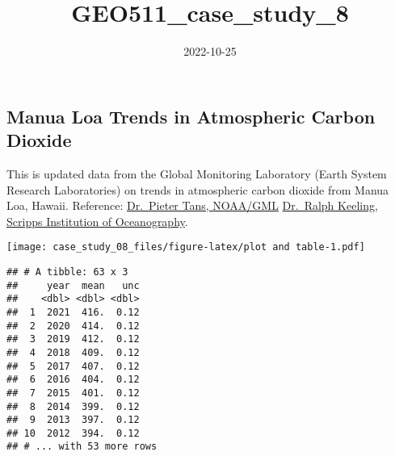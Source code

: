 \documentclass[
]{article}
\title{GEO511\_case\_study\_8}
\author{}
\date{\vspace{-2.5em}2022-10-25}
\begin{document}
\maketitle

\hypertarget{manua-loa-trends-in-atmospheric-carbon-dioxide}{%
\subsection{Manua Loa Trends in Atmospheric Carbon
Dioxide}\label{manua-loa-trends-in-atmospheric-carbon-dioxide}}

This is updated data from the Global Monitoring Laboratory (Earth System
Research Laboratories) on trends in atmospheric carbon dioxide from
Manua Loa, Hawaii. Reference:
\href{gml.noaa.gov/ccgg/trends/}{Dr.~Pieter Tans, NOAA/GML}
\href{scrippsco2.ucsd.edu/}{Dr.~Ralph Keeling, Scripps Institution of
Oceanography}.

\texttt{[image: case\_study\_08\_files/figure-latex/plot and table-1.pdf]}

\begin{verbatim}
## # A tibble: 63 x 3
##     year  mean   unc
##    <dbl> <dbl> <dbl>
##  1  2021  416.  0.12
##  2  2020  414.  0.12
##  3  2019  412.  0.12
##  4  2018  409.  0.12
##  5  2017  407.  0.12
##  6  2016  404.  0.12
##  7  2015  401.  0.12
##  8  2014  399.  0.12
##  9  2013  397.  0.12
## 10  2012  394.  0.12
## # ... with 53 more rows
\end{verbatim}
\end{document}
